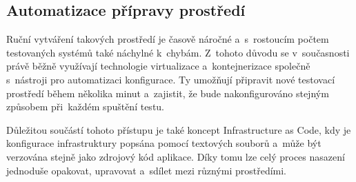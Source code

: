 \subsection{Automatizace přípravy prostředí}
Ruční vytváření takových prostředí je časově náročné a~s~rostoucím počtem testovaných systémů také náchylné k~chybám. 
Z~tohoto důvodu se v~současnosti právě běžně využívají technologie virtualizace a~kontejnerizace společně s~nástroji pro automatizaci konfigurace. 
Ty umožňují připravit nové testovací prostředí během několika minut a~zajistit, že bude nakonfigurováno stejným způsobem při~každém spuštění testu.

Důležitou součástí tohoto přístupu je také koncept Infrastructure as Code, kdy je konfigurace infrastruktury popsána pomocí textových souborů a~může být verzována stejně jako zdrojový kód aplikace. 
Díky tomu lze celý proces nasazení jednoduše opakovat, upravovat a~sdílet mezi různými prostředími.

